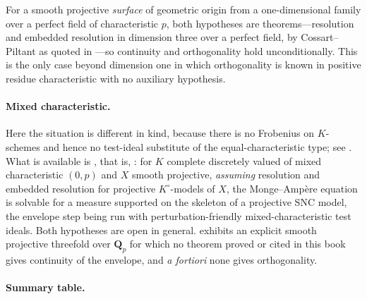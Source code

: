 For a smooth projective \emph{surface} of geometric origin from a
one-dimensional family over a perfect field of characteristic \(p\), both
hypotheses are theorems---resolution and embedded resolution in dimension
three over a perfect field, by Cossart--Piltant as quoted in
---so continuity and orthogonality hold
unconditionally.  This is the only case beyond dimension one in which
orthogonality is known in positive residue characteristic with no auxiliary
hypothesis.

\paragraph{Mixed characteristic.}
Here the situation is different in kind, because there is no Frobenius on
\(K\)-schemes and hence no test-ideal substitute of the equal-characteristic
type; see .  What is available is
, that is, \cite{FGK25}: for \(K\)
complete discretely valued of mixed characteristic \((0,p)\) and \(X\)
smooth projective, \emph{assuming} resolution and embedded resolution for
projective \(K^\circ\)-models of \(X\), the Monge--Amp\`ere equation is
solvable for a measure supported on the skeleton of a projective SNC model,
the envelope step being run with perturbation-friendly mixed-characteristic
test ideals.  Both hypotheses are open in general.
 exhibits an explicit smooth projective
threefold over \(\mathbf Q_p\) for which no theorem proved or cited in this
book gives continuity of the envelope, and \emph{a fortiori} none gives
orthogonality.

\paragraph{Summary table.}


